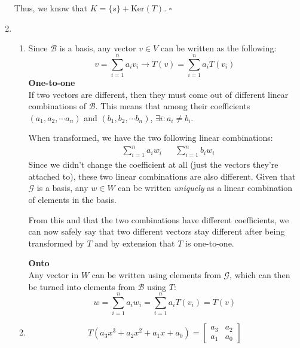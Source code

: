 \documentclass[12pt]{article}
\begin{document}
\begin{enumerate}
            Thus, we know that $K=\{s\}+\text{Ker}(T)$. $\square$
      \item \begin{enumerate}
                  \item Since $\mathcal{B}$ is a basis, any vector $v \in V$ can be written as the following:
                        \[v=\sum_{i=1}^n a_iv_i \rightarrow T(v)=\sum_{i=1}^n a_i T(v_i)\]
                        \textbf{One-to-one} \\
                        If two vectors are different, then they must come out of different linear combinations of $\mathcal{B}$.
                        This means that among their coefficients $(a_1, a_2, \cdots a_n)$ and $(b_1, b_2, \cdots b_n)$,
                        $\exists i: a_i \ne b_i$.

                        When transformed, we have the two following linear combinations:
                        \begin{align*}
                               & \sum_{i=1}^n a_i w_i &  & \sum_{i=1}^{n} b_i w_i
                        \end{align*}
                        Since we didn't change the coefficient at all (just the vectors they're attached to),
                        these two linear combinations are also different.
                        Given that $\mathcal{G}$ is a basis, any $w \in W$ can be written \textit{uniquely}
                        as a linear combination of elements in the basis.

                        From this and that the two combinations have different coefficients, we can now safely
                        say that two different vectors stay different after being transformed by $T$
                        and by extension that $T$ is one-to-one.

                        \textbf{Onto} \\
                        Any vector in $W$ can be written using elements from $\mathcal{G}$,
                        which can then be turned into elements from $\mathcal{B}$ using $T$:
                        \[w=\sum_{i=1}^n a_iw_i =\sum_{i=1}^n a_i T(v_i)=T(v)\]

                  \item \[T\left(a_3x^3+a_2x^2+a_1x+a_0\right)=\begin{bmatrix}
                                    a_3 & a_2 \\
                                    a_1 & a_0
                              \end{bmatrix}\]
            \end{enumerate}
\end{enumerate}
\end{document}
